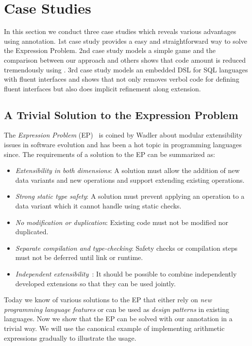 \section{Case Studies}
In this section we conduct three case studies which reveals various advantages
using \mixin annotation. 1st case study provides a easy and straightforward way
to solve the Expression Problem. 2nd case study models a simple game and the
comparison between our approach and others shows that code amount is reduced
tremendously using \mixin. 3rd case study models an embedded DSL for SQL
languages with fluent interfaces and shows that \mixin not only removes verbol
code for defining fluent interfaces but also does implicit refinement along
extension.

\subsection{A Trivial Solution to the Expression Problem}

The \emph{Expression Problem} (EP)~\cite{wadler98expression-problem} is coined
by Wadler about modular extensibility issues in software evolution and has been
a hot topic in programming languages since. The requirements of a solution to
the EP can be summarized as: 
\begin{itemize}
\item \emph{Extensibility in both dimensions}: A solution must allow
  the addition of new data variants and new operations and support
  extending existing operations.
\item \emph{Strong static type safety}: A solution must prevent
  applying an operation to a data variant which it cannot handle using
  static checks.
\item \emph{No modification or duplication}: Existing code must not be
  modified nor duplicated.
\item \emph{Separate compilation and type-checking}: Safety checks or
  compilation steps must not be deferred until link or runtime.
\item \emph{Independent extensibility}~\cite{zenger05independentlyextensible}:
  It should be possible to combine independently developed extensions so that
  they can be used jointly.
\end{itemize}

Today we know of various solutions to the EP that either rely on \emph{new
  programming language features}
or can be used as \emph{design patterns}%
in existing languages.
Now we show that the EP can be solved with our \mixin annotation in a trivial
way. We will use the canonical example of implementing arithmetic expressions
gradually to illustrate the usage.

